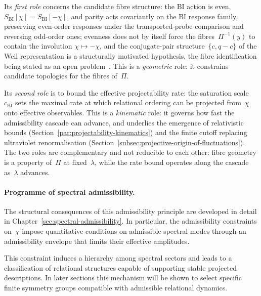     Its \emph{first role} concerns the candidate fibre structure: the BI action is
    even, $S_{\mathrm{BI}}[\chi] = S_{\mathrm{BI}}[-\chi]$, and parity acts
    covariantly on the BI response family, preserving even-order responses under the
    transported-probe comparison and reversing odd-order ones; evenness does not by
    itself force the fibres~$\Pi^{-1}(y)$ to contain
    the involution $\chi \mapsto -\chi$, and the conjugate-pair
    structure~$\{c, q{-}c\}$ of the Weil representation is a structurally motivated
    hypothesis, the fibre identification being stated as an open
    problem~\cite{Beau2026a22}.
    This is a \emph{geometric} role: it constrains candidate topologies for the
    fibres of~$\Pi$.

    Its \emph{second role} is to bound the effective projectability rate: the
    saturation scale~$c_{\mathrm{BI}}$ sets the maximal rate at which relational
    ordering can be projected from~$\chi$ onto effective observables.
    This is a \emph{kinematic} role: it governs how fast the admissibility
    cascade can advance, and underlies the emergence of relativistic bounds
    (Section~\ref{par:projectability-kinematics}) and the finite cutoff
    replacing ultraviolet renormalisation (Section~\ref{subsec:projective-origin-of-fluctuations}).
    The two roles are complementary and not reducible to each other: fibre
    geometry is a property of~$\Pi$ at fixed~$\lambda$, while the rate bound
    operates along the cascade as~$\lambda$ advances.

  \paragraph{Programme of spectral admissibility.}
    The structural consequences of this admissibility principle are
    developed in detail in Chapter~\ref{sec:spectral-admissibility}.
    In particular, the admissibility constraints on~$\chi$ impose quantitative
    conditions on admissible spectral modes through an admissibility envelope
    that limits their effective amplitudes.

    This constraint induces a hierarchy among spectral sectors and leads
    to a classification of relational structures capable of supporting
    stable projected descriptions.
    In later sections this mechanism will be shown to select specific
    finite symmetry groups compatible with admissible relational dynamics.
